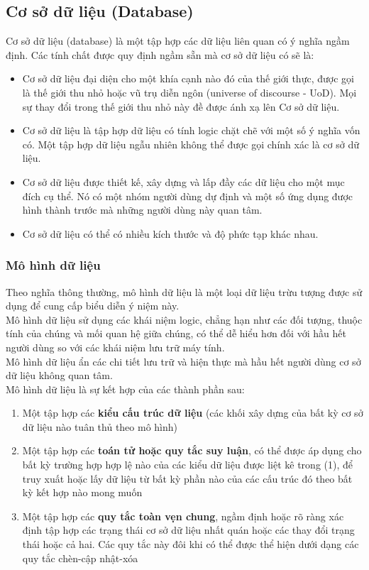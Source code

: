 \subsection{Cơ sở dữ liệu (Database)}
\hspace*{0.5cm} Cơ sở dữ liệu (database) là một tập hợp các dữ liệu liên quan có ý nghĩa ngầm định. Các tính chất được quy định ngầm sẵn mà cơ sở dữ liệu có sẽ là: 
\begin{itemize}
	\item Cơ sở dữ liệu đại diện cho một khía cạnh nào đó của thế giới thực, được gọi là thế giới thu nhỏ hoặc vũ trụ diễn ngôn (universe of discourse - UoD). Mọi sự thay đổi trong thế giới thu nhỏ này đề được ánh xạ lên Cơ sở dữ liệu.
	\item Cơ sở dữ liệu là tập hợp dữ liệu có tính logic chặt chẽ với một số ý nghĩa vốn có. Một tập hợp dữ liệu ngẫu nhiên không thể được gọi chính xác là cơ sở dữ liệu.
	\item Cơ sở dữ liệu được thiết kế, xây dựng và lấp đầy các dữ liệu cho một mục đích cụ thể. Nó có một nhóm người dùng dự định và một số ứng dụng được hình thành trước mà những người dùng này quan tâm.
	\item Cơ sở dữ liệu có thể có nhiều kích thước và độ phức tạp khác nhau.
\end{itemize}
\subsubsection{Mô hình dữ liệu}
\hspace*{0.5cm} Theo nghĩa thông thường, mô hình dữ liệu là một loại dữ liệu trừu tượng được sử dụng để cung cấp biểu diễn ý niệm này.\\
\hspace*{0.5cm} Mô hình dữ liệu sử dụng các khái niệm logic, chẳng hạn như các đối tượng, thuộc tính của chúng và mối quan hệ giữa chúng, có thể dễ hiểu hơn đối với hầu hết người dùng so với các khái niệm lưu trữ máy tính.\\
\hspace*{0.5cm} Mô hình dữ liệu ẩn các chi tiết lưu trữ và hiện thực mà hầu hết người dùng cơ sở dữ liệu không quan tâm.\\
\hspace*{0.5cm} Mô hình dữ liệu là sự kết hợp của các thành phần sau:
\begin{enumerate}
	\item Một tập hợp các \textbf{kiểu cấu trúc dữ liệu} (các khối xây dựng của bất kỳ cơ sở dữ liệu nào tuân thủ theo mô hình)
	\item Một tập hợp các \textbf{toán tử hoặc quy tắc suy luận}, có thể được áp dụng cho bất kỳ trường hợp hợp lệ nào của các kiểu dữ liệu được liệt kê trong (1), để truy xuất hoặc lấy dữ liệu từ bất kỳ phần nào của các cấu trúc đó theo bất kỳ kết hợp nào mong muốn
	\item Một tập hợp các \textbf{quy tắc toàn vẹn chung}, ngầm định hoặc rõ ràng xác định tập hợp các trạng thái cơ sở dữ liệu nhất quán hoặc các thay đổi trạng thái hoặc cả hai. Các quy tắc này đôi khi có thể được thể hiện dưới dạng các quy tắc chèn-cập nhật-xóa
\end{enumerate}